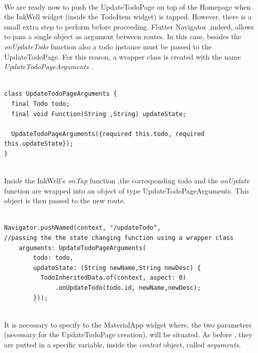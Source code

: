  \mbox{}\\
We are ready now to push the UpdateTodoPage on top of the Homepage when the InkWell widget (inside the TodoItem widget) is tapped. However, there is a small extra step to perform before proceeding.  Flutter Navigator ,indeed, allows to pass a single object as argument between routes. In this case, besides the \textit{onUpdateTodo} function also a todo instance must be passed to the UpdateTodoPage. For this reason, a wrapper class is created with the name \textit{UpdateTodoPageArguments }.
\mbox{}\\
\begin{code}
\mbox{}
\label{code:2.40}
\begin{verbatim}

class UpdateTodoPageArguments {
  final Todo todo;
  final void Function(String ,String) updateState;

  UpdateTodoPageArguments({required this.todo, required this.updateState});
}
\end{verbatim}
\end{code}
\mbox{}\\
Inside the InkWell’s \textit{onTap }function ,the corresponding todo and the \textit{onUpdate} function are wrapped into an object of type UpdateTodoPageArguments. This object is then passed to the new route.
\mbox{}\\
\begin{code}
\mbox{}
\label{code:2.42}
\begin{verbatim}

Navigator.pushNamed(context, "/updateTodo",
//passing the the state changing function using a wrapper class
    arguments: UpdateTodoPageArguments(
        todo: todo,
        updateState: (String newName,String newDesc) {
          TodoInheritedData.of(context, aspect: 0)
              .onUpdateTodo(todo.id, newName,newDesc);
        }));
\end{verbatim}
\end{code}
\mbox{}\\
It is necessary to specify to the MaterialApp widget where, the two parameters (necessary for the UpdateTodoPage creation), will be situated. As before , they are putted in a specific variable, inside the \textit{context} object, called \textit{arguments.}
